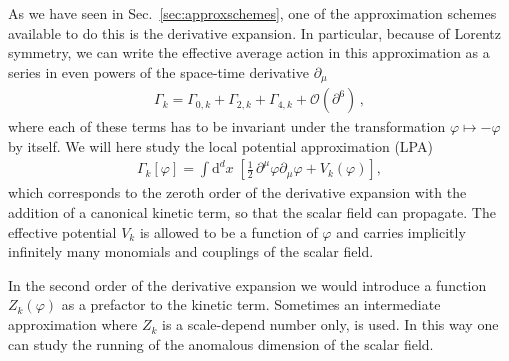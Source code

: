 \documentclass[11pt]{book}
\numberwithin{equation}{chapter}
\begin{document}
As we have seen in Sec.~\ref{sec:approxschemes}, one of the approximation
schemes available to do this is the derivative expansion.
In particular, because of Lorentz symmetry, we can write the effective
average action in this approximation as a series in even powers of the
space-time derivative $\partial_\mu$
\begin{align}
  \Gamma_k = \Gamma_{0,k}  + \Gamma_{2,k} +  \Gamma_{4,k} + \mathcal O(\partial^6) \,,
\end{align}
where each of these terms has to be invariant under the transformation
$\varphi \mapsto - \varphi$ by itself. We will here study the
local potential approximation (LPA)
\begin{align}
  \Gamma_k [\varphi] = \int \mathrm d^dx \;
  \left[
    \frac 12 \, \partial^\mu \varphi \partial_\mu \varphi
    + V_k (\varphi)
  \right] ,
\end{align}
which corresponds to the zeroth order of the derivative expansion
with the addition of a canonical kinetic term, so that the
scalar field can propagate. The effective potential $V_k$ is
allowed to be a function of $\varphi$ and carries implicitly
infinitely many monomials and couplings of the scalar field.

In the second order of the derivative
expansion we would introduce a function
$Z_k(\varphi)$ as a prefactor to the kinetic term.
Sometimes an intermediate approximation where $Z_k$ is a scale-depend
number only, is used. In this way one can study the running of
the anomalous dimension of the scalar field.
\end{document}
